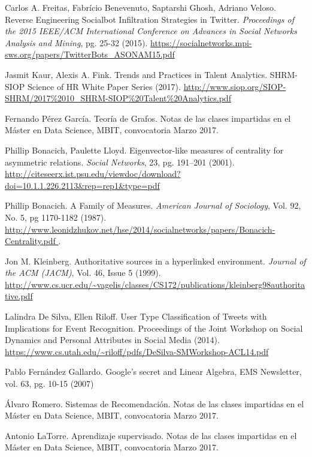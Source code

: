 \begin{thebibliography}{3}
 Carlos A. Freitas, Fabrício Benevenuto, Saptarshi Ghosh, Adriano Veloso.
Reverse Engineering Socialbot Infiltration Strategies in Twitter.
{\em Proceedings of the 2015 IEEE/ACM International Conference on Advances in Social Networks Analysis and Mining}, pg. 25-32 (2015).
\url{https://socialnetworks.mpi-sws.org/papers/TwitterBots_ASONAM15.pdf }

 Jasmit Kaur, Alexis A. Fink. Trends and Practices in Talent
Analytics. SHRM-SIOP Science of HR White Paper Series (2017).
\url{http://www.siop.org/SIOP-SHRM/2017%2010_SHRM-SIOP%20Talent%20Analytics.pdf }

 Fernando Pérez García. Teoría de Grafos. Notas de las clases
impartidas en el Máster en Data Science, MBIT, convocatoria Marzo 2017.

 Phillip Bonacich, Paulette Lloyd. 
Eigenvector-like measures of centrality for asymmetric relations.
{\em Social Networks}, 23, pg. 191–201 (2001).
\url{http://citeseerx.ist.psu.edu/viewdoc/download?doi=10.1.1.226.2113&rep=rep1&type=pdf }

 Phillip Bonacich. A Family of Measures. {\em American Journal 
of Sociology}, Vol. 92, No. 5, pg 1170-1182 (1987). 
\url{http://www.leonidzhukov.net/hse/2014/socialnetworks/papers/Bonacich-Centrality.pdf }.

Jon M. Kleinberg. Authoritative sources in a hyperlinked environment.
{\em Journal of the ACM (JACM)}, Vol. 46, Issue 5 (1999).
\url{http://www.cs.ucr.edu/~vagelis/classes/CS172/publications/kleinberg98authoritative.pdf } 


 Lalindra De Silva, Ellen Riloff. User Type Classification of Tweets with Implications 
for Event Recognition. Proceedings of the Joint Workshop on Social Dynamics and Personal Attributes 
in Social Media (2014).
\url{https://www.cs.utah.edu/~riloff/pdfs/DeSilva-SMWorkshop-ACL14.pdf }

 Pablo Fernández Gallardo. Google’s secret and Linear Algebra,
 EMS Newsletter, vol. 63, pg. 10-15 (2007)

 Álvaro Romero. Sistemas de Recomendación. Notas de las clases
impartidas en el Máster en Data Science, MBIT, convocatoria Marzo 2017.

 Antonio LaTorre. Aprendizaje supervisado. Notas de las clases
impartidas en el Máster en Data Science, MBIT, convocatoria Marzo 2017.
\end{thebibliography}